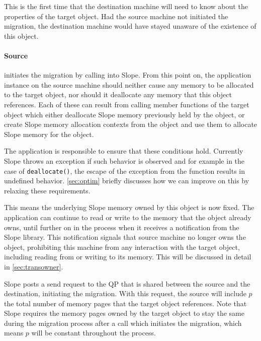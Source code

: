 This is the first time that the destination
machine will need to know about the properties of the target object. Had the
source machine not initiated the migration, the destination machine would have
stayed unaware of the existence of this object.

\paragraph{Source}
initiates the migration by calling into Slope. From this point
on, the application instance on the source machine should neither
cause any memory to be allocated to the target object, nor should it deallocate any memory that
this object references. Each of these can result from calling member functions
of the target object which either deallocate Slope memory previously held by the
object, or create Slope memory allocation contexts from the object and
use them to allocate Slope memory for the object.

The application is responsible
to ensure that these conditions hold. Currently Slope throws an exception if such
behavior is observed and for example in the case of \texttt{deallocate()}, the
escape of the exception from the function results in undefined behavior.
\autoref{sec:optim} briefly discusses how we can improve on this by relaxing
these requirements.

This means the underlying Slope memory owned by this object is now
fixed. The application can continue to read or write to the memory that the
object already owns, until further on in the process when it receives a
notification from the Slope library. This notification signals that source
machine no longer owns the object, prohibiting this machine from any
interaction with the target object, including reading from or writing to its
memory. This will be discussed in detail in \autoref{sec:transowner}.

Slope posts a send request to the QP that is shared
between the source and the destination, initiating the migration.
With this request, the source will include $p$ the total number of
memory pages that the target object references. Note that Slope requires the
memory pages owned by the target object to stay the same during the migration
process after a call which initiates the migration, which means $p$ will be
constant throughout the process.

